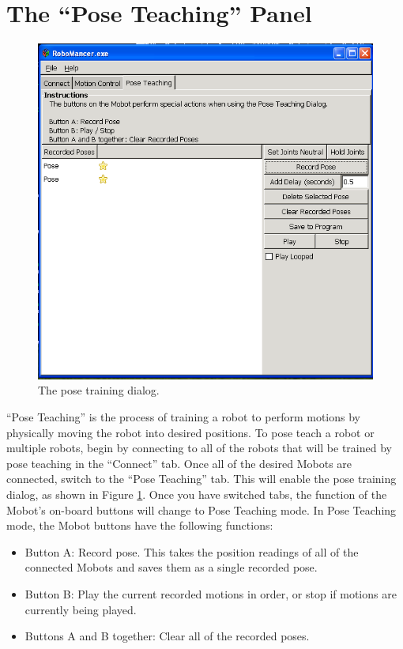 \documentclass{article}
\begin{document}
\section{The ``Pose Teaching'' Panel}
\begin{figure}[H]
\begin{center}
\includegraphics[width=4.5in]{images/posetrain.png}
\end{center}
\caption{\label{fig:posetrain.png} The pose training dialog.}
\end{figure}

``Pose Teaching'' is the process of training a robot to perform motions by physically
moving the robot into desired positions. To pose teach a robot or multiple robots,
begin by connecting to all of the robots that will be trained by pose teaching
in the ``Connect'' tab. Once all of the desired Mobots are connected, switch to
the ``Pose Teaching'' tab. This will enable the pose training dialog, as shown
in Figure \ref{fig:posetrain.png}.  Once you have switched tabs, the function of the
Mobot's on-board buttons will change to Pose Teaching mode. In Pose Teaching mode,
the Mobot buttons have the following functions:
\begin{itemize}
\item Button A: Record pose. This takes the position readings of all of the
connected Mobots and saves them as a single recorded pose.
\item Button B: Play the current recorded motions in order, or stop if motions are currently being played.
\item Buttons A and B together: Clear all of the recorded poses.
\end{itemize}
\end{document}
